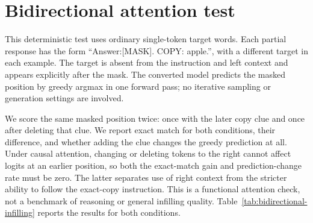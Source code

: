 \documentclass{article}
\begin{document}
\section{Bidirectional attention test}
\label{app:bidirectional-infilling}

This deterministic test uses ordinary single-token target words. Each partial response has the form ``Answer:[MASK]. COPY: apple.'', with a different target in each example. The target is absent from the instruction and left context and appears explicitly after the mask. The converted model predicts the masked position by greedy argmax in one forward pass; no iterative sampling or generation settings are involved.

We score the same masked position twice: once with the later copy clue and once after deleting that clue. We report exact match for both conditions, their difference, and whether adding the clue changes the greedy prediction at all. Under causal attention, changing or deleting tokens to the right cannot affect logits at an earlier position, so both the exact-match gain and prediction-change rate must be zero. The latter separates use of right context from the stricter ability to follow the exact-copy instruction. This is a functional attention check, not a benchmark of reasoning or general infilling quality. Table~\ref{tab:bidirectional-infilling} reports the results for both conditions.

\begin{table}[!htbp]
\caption{Bidirectional attention test results. ``With clue'' predicts the earlier mask while the word is visible later; ``without clue'' removes that later word. Gain is the exact-match difference.}
\label{tab:bidirectional-infilling}
\centering
\scriptsize
{}
\end{table}
\end{document}
